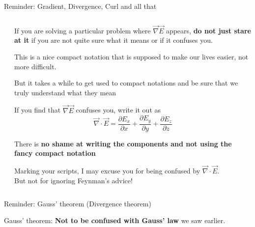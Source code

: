 {\begin{frame}{Reminder: Gradient, Divergence, Curl and all that}
\begin{columns}
\begin{column}{0.25\textwidth}
\begin{center}
   \end{center}
  \end{column}
  \begin{column}{0.75\textwidth}
    \begin{itemize}
    {\scriptsize
      \item If you are solving a particular problem where $\vec{\nabla} \vec{E}$ appears,
            {\bf do not just stare at it} if you are not quite sure what it means or if it confuses you.
      \item This is a nice compact notation that is supposed to make our lives easier,
            not more difficult.
      \item But it takes a while to get used to compact notations and be sure that we truly understand what they mean
      \item If you find that $\vec{\nabla} \vec{E}$ confuses you, write it out as
        \begin{equation*}
         \vec{\nabla} \cdot \vec{E} = \frac{\partial E_{x}}{\partial x} + \frac{\partial E_{y}}{\partial y} + \frac{\partial E_{z}}{\partial z}
        \end{equation*}
      \item There is {\bf no shame at writing the components and not using the fancy compact notation}
    }
    \end{itemize}

    \begin{center}
    {\scriptsize
     Marking your scripts, I may excuse you for being confused by $\vec{\nabla} \cdot \vec{E}$.\\
     But not for ignoring Feynman's advice!
    }
    \end{center}

  \end{column}
\end{columns}

\end{frame}


%
%
%

\begin{frame}{Reminder: Gauss' theorem (Divergence theorem)}

\begin{center}
  Gauss' theorem: {\bf Not to be confused with Gauss' law} we saw earlier.
\end{center}


\end{frame}}

